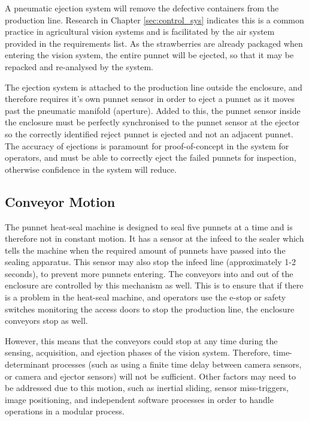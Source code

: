 \documentclass[fleqn,twoside,12pt]{report}
\begin{document}
A pneumatic ejection system will remove the defective containers from the production line. Research in Chapter \ref{sec:control_sys} indicates this is a common practice in agricultural vision systems and is facilitated by the air system provided in the requirements list. As the strawberries are already packaged when entering the vision system, the entire punnet will be ejected, so that it may be repacked and re-analysed by the system.

The ejection system is attached to the production line outside the enclosure, and therefore requires it's own punnet sensor in order to eject a punnet as it moves past the pneumatic manifold (aperture). Added to this, the punnet sensor inside the enclosure must be perfectly synchronised to the punnet sensor at the ejector so the correctly identified reject punnet is ejected and not an adjacent punnet. The accuracy of ejections is paramount for proof-of-concept in the system for operators, and must be able to correctly eject the failed punnets for inspection, otherwise confidence in the system will reduce.


\subsection{Conveyor Motion}

The punnet heat-seal machine is designed to seal five punnets at a time and is therefore not in constant motion. It has a sensor at the infeed to the sealer which tells the machine when the required amount of punnets have passed into the sealing apparatus. This sensor may also stop the infeed line (approximately 1-2 seconds), to prevent more punnets entering. The conveyors into and out of the enclosure are controlled by this mechanism as well. This is to ensure that if there is a problem in the heat-seal machine, and operators use the e-stop or safety switches monitoring the access doors to stop the production line, the enclosure conveyors stop as well.

However, this means that the conveyors could stop at any time during the sensing, acquisition, and ejection phases of the vision system. Therefore, time-determinant processes (such as using a finite time delay between camera sensors, or camera and ejector sensors) will not be sufficient. Other factors may need to be addressed due to this motion, such as inertial sliding, sensor miss-triggers, image positioning, and independent software processes in order to handle operations in a modular process. 
\end{document}

